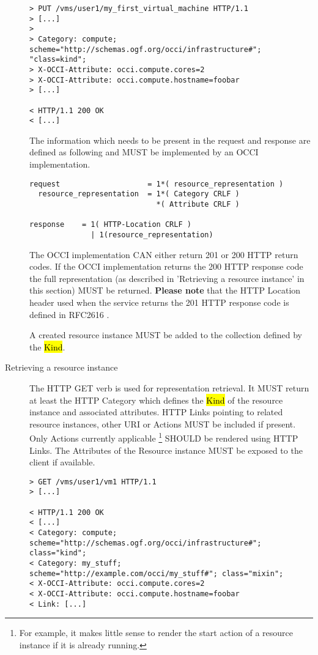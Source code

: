 \documentclass[10pt,a4paper]{article}
\begin{document}
\begin{description}
\begin{verbatim}
> PUT /vms/user1/my_first_virtual_machine HTTP/1.1
> [...]
> 
> Category: compute; scheme="http://schemas.ogf.org/occi/infrastructure#"; "class=kind"; 
> X-OCCI-Attribute: occi.compute.cores=2
> X-OCCI-Attribute: occi.compute.hostname=foobar
> [...]
 
< HTTP/1.1 200 OK
< [...]
\end{verbatim}

    The information which needs to be present in the request and
    response are defined as following and MUST be implemented by an
    OCCI implementation.

\begin{verbatim}
request                    = 1*( resource_representation )
  resource_representation  = 1*( Category CRLF )
                             *( Attribute CRLF )

response    = 1( HTTP-Location CRLF ) 
              | 1(resource_representation)
\end{verbatim}

    The OCCI implementation CAN either return 201 or 200 HTTP return
    codes. If the OCCI implementation returns the 200 HTTP response
    code the full representation (as described in 'Retrieving a
    resource instance' in this section) MUST be
    returned. \textbf{Please note} that the HTTP Location header used
    when the service returns the 201 HTTP response code is defined in
    RFC2616 \cite{rfc2616}.
  
    A created resource instance MUST be added
    to the collection defined by the \hl{Kind}.

  \item[Retrieving a resource instance] The HTTP GET verb is used for
    representation retrieval. It MUST return at least the HTTP Category which defines
    the \hl{Kind} of the resource instance and associated
    attributes. HTTP Links pointing to related resource instances,
    other URI or Actions MUST be included if present. Only Actions
    currently applicable \footnote{For example, it makes little sense to render the start action of a
    resource instance if it is already running.} SHOULD be rendered using HTTP Links. The
    Attributes of the Resource instance MUST be exposed to the client
    if available.

\begin{verbatim}
> GET /vms/user1/vm1 HTTP/1.1
> [...]
 
< HTTP/1.1 200 OK
< [...]
< Category: compute; scheme="http://schemas.ogf.org/occi/infrastructure#"; class="kind";
< Category: my_stuff; scheme="http://example.com/occi/my_stuff#"; class="mixin";
< X-OCCI-Attribute: occi.compute.cores=2
< X-OCCI-Attribute: occi.compute.hostname=foobar
< Link: [...]
\end{verbatim}


\end{description}
\end{document}
